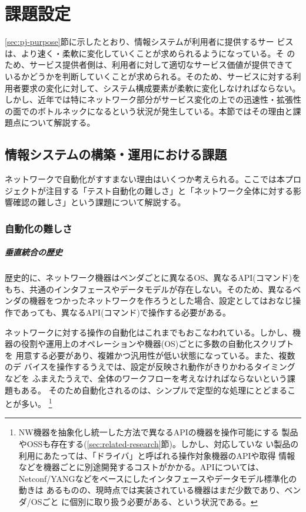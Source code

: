 
\chapter{課題設定}
\label{chap:problem-setting}

\ref{sec:pj-purpose}節に示したとおり、情報システムが利用者に提供するサー
ビスは、より速く・柔軟に変化していくことが求められるようになっている。そ
のため、サービス提供者側は、利用者に対して適切なサービス価値が提供できて
いるかどうかを判断していくことが求められる。そのため、サービスに対する利
用者要求の変化に対して、システム構成要素が柔軟に変化しなければならない。
しかし、近年では特にネットワーク部分がサービス変化の上での迅速性・拡張性
の面でのボトルネックになるという状況が発生している。本節ではその理由と課
題点について解説する。

 \section{情報システムの構築・運用における課題}
 \label{sec:system-problem}

ネットワークで自動化がすすまない理由はいくつか考えられる。ここでは本プロ
ジェクトが注目する「テスト自動化の難しさ」と「ネットワーク全体に対する影
響確認の難しさ」という課題について解説する。


  \subsection{自動化の難しさ}
  \label{sec:difficulty}

    \paragraph{垂直統合の歴史}
歴史的に、ネットワーク機器はベンダごとに異なるOS、異なるAPI(コマンド)を
もち、共通のインタフェースやデータモデルが存在しない。そのため、異なるベ
ンダの機器をつかったネットワークを作ろうとした場合、設定としてはおなじ操
作であっても、異なるAPI(コマンド)で操作する必要がある。

ネットワークに対する操作の自動化はこれまでもおこなわれている。しかし、機
器の役割や運用上のオペレーションや機器(OS)ごとに多数の自動化スクリプトを
用意する必要があり、複雑かつ汎用性が低い状態になっている。また、複数のデ
バイスを操作するうえでは、設定が反映され動作がきりかわるタイミングなどを
ふまえたうえで、全体のワークフローを考えなければならないという課題もある。
そのため自動化されるのは、シンプルで定型的な処理にとどまることが多い。
\footnote{NW機器を抽象化し統一した方法で異なるAPIの機器を操作可能にする
製品やOSSも存在する(\ref{sec:related-research}節)。しかし、対応していな
い製品の利用にあたっては、「ドライバ」と呼ばれる操作対象機器のAPIや取得
情報などを機器ごとに別途開発するコストがかかる。APIについては、
Netconf/YANGなどをベースにしたインタフェースやデータモデル標準化の動きは
あるものの、現時点では実装されている機器はまだ少数であり、ベンダ/OSごと
に個別に取り扱う必要がある、という状況である。}

